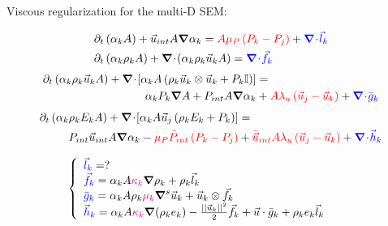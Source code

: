 \documentclass[xcolor=dvipsnames,10pt]{beamer}
\renewcommand{\div}{\boldsymbol{\nabla}\! \cdot \!}
\newcommand{\grad}{\boldsymbol{\nabla}}
\begin{document}
\begin{frame}{Viscous regularization for the multi-D SEM:}
\begin{block}{}
\begin{align}
&\partial_t \left( \alpha_k  A\right) + \vec{u}_{int} A \grad \alpha_k = {\color{red}A \mu_P \left( P_k - P_j \right)} + {\color{blue}\div \vec{l}_k} \nonumber \\
\vspace{6pt}
&\partial_t \left( \alpha_k \rho_k A \right) + \div \left( \alpha_k \rho_k \vec{u}_k A \right) = {\color{blue}\div \vec{f}_k} \nonumber
\end{align}
\begin{align}
\partial_t \left( \alpha_k \rho_k \vec{u}_k A \right) + \div \left[ \alpha_k A \left( \rho_k \vec{u}_k\otimes \vec{u}_k + P_k\mathbb{I}\right) \right] &=  \nonumber \\
\alpha_k P_k \grad A +  P_{int} A \grad \alpha_k &+  {\color{red}A \lambda_u \left( \vec{u}_j - \vec{u}_k \right)} +{\color{blue}\div \bar{g}_k}\nonumber
\end{align}
\begin{align}
\partial_t \left( \alpha_k \rho_k E_k A \right) + \div \left[ \alpha_k A \vec{u}_j \left( \rho_k E_k + P_k \right) \right] &= \nonumber \\
P_{int} \vec{u}_{int} A \grad \alpha_k - {\color{red}\mu_P \bar{P}_{int} \left( P_k-P_j \right)} &+{\color{red}\bar{\vec{u}}_{int} A \lambda_u \left( \vec{u}_j - \vec{u}_k \right)} + {\color{blue}\div \vec{h}_k} \nonumber
\end{align}
\end{block}
\begin{block}{}
\begin{equation}
\left\{
\begin{array}{lcl}
{\color{blue}\vec{l}_k} = ? \\ %
{\color{blue}\vec{f}_k} = \alpha_k A {\color{magenta}\kappa_k}  \grad \rho_k + \rho_k \vec{l}_k& & \\
{\color{blue}\bar{g}_k} = \alpha_k A \rho_k {\color{magenta}\mu_k} \grad^s \vec{u}_k + \vec{u}_k \otimes \vec{f}_k & & \\
{\color{blue}\vec{h}_k} = \alpha_k A {\color{magenta}\kappa_k} \grad(\rho_k e_k) - \frac{||\vec{u}_k||^2}{2} \vec{f}_k + \vec{u} \cdot \bar{g}_k + \rho_k e_k \vec{l}_k & &
\end{array}
\right.
\nonumber
\end{equation}
\end{block}
\end{frame}
\end{document}
